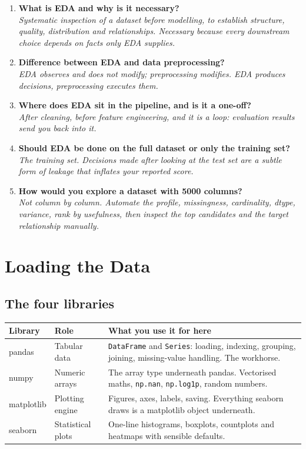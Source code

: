 \documentclass[11pt,a4paper]{article}
\begin{document}
\begin{enumerate}\itemsep4pt
  \item \textbf{What is EDA and why is it necessary?}\\
        \emph{Systematic inspection of a dataset before modelling, to establish structure,
        quality, distribution and relationships. Necessary because every downstream choice
        depends on facts only EDA supplies.}
  \item \textbf{Difference between EDA and data preprocessing?}\\
        \emph{EDA observes and does not modify; preprocessing modifies. EDA produces
        decisions, preprocessing executes them.}
  \item \textbf{Where does EDA sit in the pipeline, and is it a one-off?}\\
        \emph{After cleaning, before feature engineering, and it is a loop: evaluation
        results send you back into it.}
  \item \textbf{Should EDA be done on the full dataset or only the training set?}\\
        \emph{The training set. Decisions made after looking at the test set are a subtle
        form of leakage that inflates your reported score.}
  \item \textbf{How would you explore a dataset with 5000 columns?}\\
        \emph{Not column by column. Automate the profile, missingness, cardinality, dtype,
        variance, rank by usefulness, then inspect the top candidates and the target
        relationship manually.}
\end{enumerate}

\newpage
\section{Loading the Data}

\subsection{The four libraries}

\begin{tabularx}{\textwidth}{@{}>{\ttfamily}l l X@{}}
\toprule
\rowcolor{tablehead} \textrm{\bfseries Library} & \textbf{Role} & \textbf{What you use it for here} \\
\midrule
pandas & Tabular data & \lstinline|DataFrame| and \lstinline|Series|: loading, indexing, grouping, joining, missing-value handling. The workhorse. \\
numpy & Numeric arrays & The array type underneath pandas. Vectorised maths, \lstinline|np.nan|, \lstinline|np.log1p|, random numbers. \\
matplotlib & Plotting engine & Figures, axes, labels, saving. Everything seaborn draws is a matplotlib object underneath. \\
seaborn & Statistical plots & One-line histograms, boxplots, countplots and heatmaps with sensible defaults. \\
\bottomrule
\end{tabularx}
\end{document}

